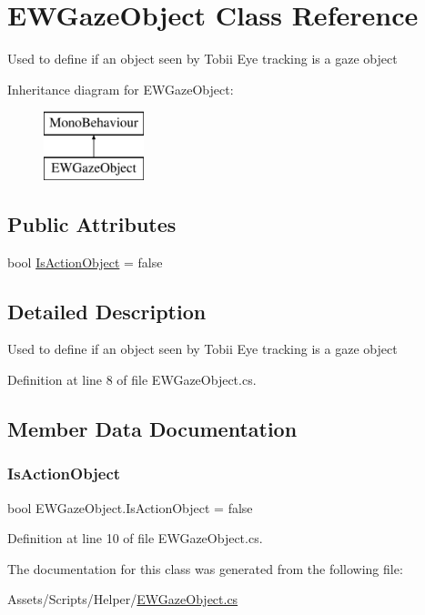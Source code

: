\hypertarget{class_e_w_gaze_object}{}\section{E\+W\+Gaze\+Object Class Reference}
\label{class_e_w_gaze_object}


Used to define if an object seen by Tobii Eye tracking is a gaze object  


Inheritance diagram for E\+W\+Gaze\+Object\+:\begin{figure}[H]
\begin{center}
\leavevmode
\includegraphics[height=2.000000cm]{class_e_w_gaze_object}
\end{center}
\end{figure}
\subsection*{Public Attributes}
\begin{DoxyCompactItemize}
\item 
bool \mbox{\hyperlink{class_e_w_gaze_object_ab1e12707171f45cc4d7bd888ae542d9c}{Is\+Action\+Object}} = false
\end{DoxyCompactItemize}


\subsection{Detailed Description}
Used to define if an object seen by Tobii Eye tracking is a gaze object 



Definition at line 8 of file E\+W\+Gaze\+Object.\+cs.



\subsection{Member Data Documentation}
\mbox{\label{class_e_w_gaze_object_ab1e12707171f45cc4d7bd888ae542d9c}} 
\subsubsection{\texorpdfstring{Is\+Action\+Object}{IsActionObject}}
{\footnotesize\ttfamily bool E\+W\+Gaze\+Object.\+Is\+Action\+Object = false}



Definition at line 10 of file E\+W\+Gaze\+Object.\+cs.



The documentation for this class was generated from the following file\+:\begin{DoxyCompactItemize}
\item 
Assets/\+Scripts/\+Helper/\mbox{\hyperlink{_e_w_gaze_object_8cs}{E\+W\+Gaze\+Object.\+cs}}\end{DoxyCompactItemize}
